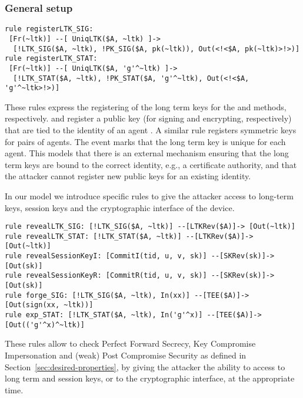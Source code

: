 \subsubsection{General setup}
\begin{lstlisting}
rule registerLTK_SIG:
 [Fr(~ltk)] --[ UniqLTK($A, ~ltk) ]->
  [!LTK_SIG($A, ~ltk), !PK_SIG($A, pk(~ltk)), Out(<!<$A, pk(~ltk)>!>)]
rule registerLTK_STAT:
 [Fr(~ltk)] --[ UniqLTK($A, 'g'^~ltk) ]->
  [!LTK_STAT($A, ~ltk), !PK_STAT($A, 'g'^~ltk), Out(<!<$A, 'g'^~ltk>!>)]
\end{lstlisting}

These rules express the registering of the long term keys for the \mSig{} and
\mStat{} methods, respectively.
%
 and  register a public key (for
signing and encrypting, respectively) that are tied to the identity of an agent
. A similar rule  registers symmetric keys for pairs
of agents.
%
The event  marks that the long term key is unique for each
agent.
This models that there is an external mechanism ensuring that the
long term keys are bound to the correct identity, e.g., a certificate authority,
and that the attacker cannot register new public keys for an existing identity.

In our model we introduce specific rules to give the attacker access to
long-term keys, session keys and the cryptographic interface of the device.
\begin{lstlisting}
rule revealLTK_SIG: [!LTK_SIG($A, ~ltk)] --[LTKRev($A)]-> [Out(~ltk)]
rule revealLTK_STAT: [!LTK_STAT($A, ~ltk)] --[LTKRev($A)]-> [Out(~ltk)]
rule revealSessionKeyI: [CommitI(tid, u, v, sk)] --[SKRev(sk)]-> [Out(sk)]
rule revealSessionKeyR: [CommitR(tid, u, v, sk)] --[SKRev(sk)]-> [Out(sk)]
rule forge_SIG: [!LTK_SIG($A, ~ltk), In(xx)] --[TEE($A)]-> [Out(sign(xx, ~ltk))]
rule exp_STAT: [!LTK_STAT($A, ~ltk), In('g'^x)] --[TEE($A)]-> [Out(('g'^x)^~ltk)]
\end{lstlisting}
These rules allow to check Perfect Forward Secrecy, Key Compromise Impersonation
and (weak) Post Compromise Security as defined in Section~\ref{sec:desired-properties},
by giving the attacker the ability to access to long term and session keys, or
to the cryptographic interface, at the appropriate time.

